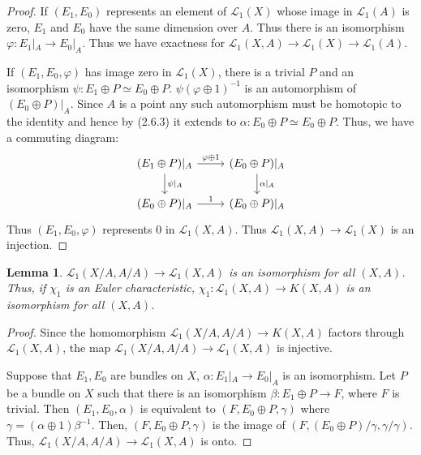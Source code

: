 \documentclass[leqno]{book}
\numberwithin{equation}{section}
\newtheorem{lemma}[theorem]{Lemma}
\theoremstyle{definition}
\begin{document}
            \begin{proof}
              If $(E_1,E_0)$ represents an element of $\mathcal{L}_{1}(X)$ whose image in $\mathcal{L}_{1}(A)$ is zero, $E_1$ and $E_0$ have the same dimension over $A$. Thus there is an isomorphism $\varphi:E_1|_{A}\to E_0|_{A}$. Thus we have exactness for $\mathcal{L}_{1}(X,A)\to \mathcal{L}_{1}(X)\to \mathcal{L}_{1}(A)$.

              If $(E_1,E_0,\varphi)$ has image zero in $\mathcal{L}_{1}(X)$, there is a trivial $P$ and an isomorphism $\psi:E_1\oplus P\simeq E_0\oplus P$. $\psi(\varphi\oplus 1)^{-1}$ is an automorphism of $(E_0\oplus P)|_{A}$. Since $A$ is a point any such automorphism must be homotopic to the identity and hence by (2.6.3) it extends to $\alpha:E_0\oplus P \simeq E_0\oplus P$. Thus, we have a commuting diagram:
              \begin{equation*}
                \begin{tikzcd}
                  (E_1\oplus P)|_{A} \arrow[r, "\varphi\oplus 1"] \arrow[d, "\psi|_{A}"] & (E_0\oplus P)|_{A} \arrow[d, "\alpha|_{A}"] \\
                  (E_0\oplus P)|_{A} \arrow[r, "1"] & (E_{0}\oplus P)|_{A}
                \end{tikzcd}
              \end{equation*}
              Thus $(E_1,E_0,\varphi)$ represents $0$ in $\mathcal{L}_{1}(X,A)$. Thus $\mathcal{L}_{1}(X,A)\to \mathcal{L}_{1}(X)$ is an injection.
            \end{proof}

            \begin{lemma}
              $\mathcal{L}_{1}(X/A,A/A)\to \mathcal{L}_{1}(X,A)$ is an isomorphism for all $(X,A)$. Thus, if $\chi_1$ is an Euler characteristic, $\chi_1:\mathcal{L}_{1}(X,A)\to K(X,A)$ is an isomorphism for all $(X,A)$.
            \end{lemma}

            \begin{proof}
              Since the homomorphism $\mathcal{L}_{1}(X/A,A/A)\to K(X,A)$ factors through $\mathcal{L}_{1}(X,A)$, the map $\mathcal{L}_{1}(X/A,A/A)\to \mathcal{L}_{1}(X,A)$ is injective.

              Suppose that $E_1,E_0$ are bundles on $X$, $\alpha:E_1|_{A}\to E_{0}|_{A}$ is an isomorphism. Let $P$ be a bundle on $X$ such that there is an isomorphism $\beta:E_1\oplus P\to F$, where $F$ is trivial. Then $(E_1,E_0,\alpha)$ is equivalent to $(F,E_0\oplus P,\gamma)$ where $\gamma=(\alpha\oplus 1)\beta^{-1}$. Then, $(F,E_0\oplus P,\gamma)$ is the image of $(F,(E_0\oplus P)/\gamma,\gamma/\gamma)$. Thus, $\mathcal{L}_{1}(X/A,A/A)\to \mathcal{L}_{1}(X,A)$ is onto.
            \end{proof}
\end{document}
